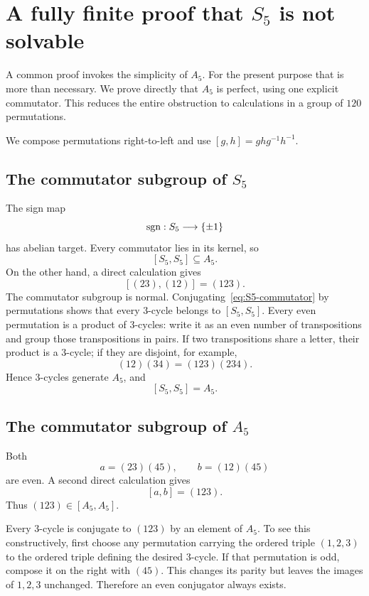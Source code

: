 \section{A fully finite proof that \texorpdfstring{$S_5$}{S5} is not solvable}
\label{sec:s5-nonsolvable}

A common proof invokes the simplicity of $A_5$.  For the present purpose that
is more than necessary.  We prove directly that $A_5$ is perfect, using one
explicit commutator.  This reduces the entire obstruction to calculations in
a group of $120$ permutations.

We compose permutations right-to-left and use
$[g,h]=ghg^{-1}h^{-1}$.

\subsection{The commutator subgroup of \texorpdfstring{$S_5$}{S5}}

The sign map
\[
 \operatorname{sgn}:S_5\longrightarrow\{\pm1\}
\]
has abelian target.  Every commutator lies in its kernel, so
\[
 [S_5,S_5]\subseteq A_5.
 \tag{S1}\label{eq:S5-derived-subset}
\]
On the other hand, a direct calculation gives
\[
 [(23),(12)]=(123).
 \tag{S2}\label{eq:S5-commutator}
\]
The commutator subgroup is normal.  Conjugating~\eqref{eq:S5-commutator} by
permutations shows that every $3$-cycle belongs to $[S_5,S_5]$.
Every even permutation is a product of $3$-cycles: write it as an even number
of transpositions and group those transpositions in pairs.  If two
transpositions share a letter, their product is a $3$-cycle; if they are
disjoint, for example,
\[
 (12)(34)=(123)(234).
\]
Hence $3$-cycles generate $A_5$, and
\[
 [S_5,S_5]=A_5.
 \tag{S3}\label{eq:S5-derived}
\]

\subsection{The commutator subgroup of \texorpdfstring{$A_5$}{A5}}

Both
\[
 a=(23)(45),
 \qquad
 b=(12)(45)
\]
are even.  A second direct calculation gives
\[
 [a,b]=(123).
 \tag{S4}\label{eq:A5-commutator}
\]
Thus $(123)\in[A_5,A_5]$.

Every $3$-cycle is conjugate to $(123)$ by an element of $A_5$.  To see this
constructively, first choose any permutation carrying the ordered triple
$(1,2,3)$ to the ordered triple defining the desired $3$-cycle.  If that
permutation is odd, compose it on the right with $(45)$.  This changes its
parity but leaves the images of $1,2,3$ unchanged.  Therefore an even
conjugator always exists.

